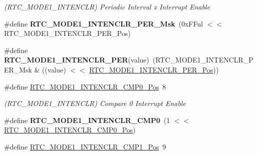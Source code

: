 \begin{DoxyCompactItemize}
\begin{DoxyCompactList}\small\item\em (R\+T\+C\+\_\+\+M\+O\+D\+E1\+\_\+\+I\+N\+T\+E\+N\+C\+L\+R) Periodic Interval x Interrupt Enable \end{DoxyCompactList}\item 
\hypertarget{group___s_a_m_l21___r_t_c_ga97da497e0eb60c1b7cca29b0bb0a43a5}{}\#define {\bfseries R\+T\+C\+\_\+\+M\+O\+D\+E1\+\_\+\+I\+N\+T\+E\+N\+C\+L\+R\+\_\+\+P\+E\+R\+\_\+\+Msk}~(0x\+F\+Ful $<$$<$ R\+T\+C\+\_\+\+M\+O\+D\+E1\+\_\+\+I\+N\+T\+E\+N\+C\+L\+R\+\_\+\+P\+E\+R\+\_\+\+Pos)\label{group___s_a_m_l21___r_t_c_ga97da497e0eb60c1b7cca29b0bb0a43a5}

\item 
\hypertarget{group___s_a_m_l21___r_t_c_ga317234d2bf6d639a3d4ee3250b565a61}{}\#define {\bfseries R\+T\+C\+\_\+\+M\+O\+D\+E1\+\_\+\+I\+N\+T\+E\+N\+C\+L\+R\+\_\+\+P\+E\+R}(value)~(R\+T\+C\+\_\+\+M\+O\+D\+E1\+\_\+\+I\+N\+T\+E\+N\+C\+L\+R\+\_\+\+P\+E\+R\+\_\+\+Msk \& ((value) $<$$<$ \hyperlink{group___s_a_m_l21___r_t_c_ga66bb2890c901fec94231d66775778264}{R\+T\+C\+\_\+\+M\+O\+D\+E1\+\_\+\+I\+N\+T\+E\+N\+C\+L\+R\+\_\+\+P\+E\+R\+\_\+\+Pos}))\label{group___s_a_m_l21___r_t_c_ga317234d2bf6d639a3d4ee3250b565a61}

\item 
\hypertarget{group___s_a_m_l21___r_t_c_ga1bb4c784be111d608e9f236277a6fa9e}{}\#define \hyperlink{group___s_a_m_l21___r_t_c_ga1bb4c784be111d608e9f236277a6fa9e}{R\+T\+C\+\_\+\+M\+O\+D\+E1\+\_\+\+I\+N\+T\+E\+N\+C\+L\+R\+\_\+\+C\+M\+P0\+\_\+\+Pos}~8\label{group___s_a_m_l21___r_t_c_ga1bb4c784be111d608e9f236277a6fa9e}

\begin{DoxyCompactList}\small\item\em (R\+T\+C\+\_\+\+M\+O\+D\+E1\+\_\+\+I\+N\+T\+E\+N\+C\+L\+R) Compare 0 Interrupt Enable \end{DoxyCompactList}\item 
\hypertarget{group___s_a_m_l21___r_t_c_ga02c8455aa83af95ee7247d0293c75bc3}{}\#define {\bfseries R\+T\+C\+\_\+\+M\+O\+D\+E1\+\_\+\+I\+N\+T\+E\+N\+C\+L\+R\+\_\+\+C\+M\+P0}~(1 $<$$<$ \hyperlink{group___s_a_m_l21___r_t_c_ga1bb4c784be111d608e9f236277a6fa9e}{R\+T\+C\+\_\+\+M\+O\+D\+E1\+\_\+\+I\+N\+T\+E\+N\+C\+L\+R\+\_\+\+C\+M\+P0\+\_\+\+Pos})\label{group___s_a_m_l21___r_t_c_ga02c8455aa83af95ee7247d0293c75bc3}

\item 
\hypertarget{group___s_a_m_l21___r_t_c_ga57240eb2e86afb12d85412cdf775876a}{}\#define \hyperlink{group___s_a_m_l21___r_t_c_ga57240eb2e86afb12d85412cdf775876a}{R\+T\+C\+\_\+\+M\+O\+D\+E1\+\_\+\+I\+N\+T\+E\+N\+C\+L\+R\+\_\+\+C\+M\+P1\+\_\+\+Pos}~9\label{group___s_a_m_l21___r_t_c_ga57240eb2e86afb12d85412cdf775876a}


\end{DoxyCompactItemize}

